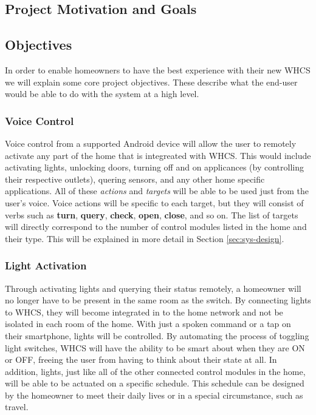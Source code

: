 
\subsection{Project Motivation and Goals}


\subsection{Objectives}
In order to enable homeowners to have the best experience with their new WHCS
we will explain some core project objectives. These describe what the end-user
would be able to do with the system at a high level.

\subsubsection{Voice Control}
Voice control
from a supported Android device will allow the user to remotely activate any
part of the home that is integreated with WHCS. This would include activating
lights, unlocking doors, turning off and on applicances (by controlling their
respective outlets), quering sensors, and any other home specific applications.
All of these \emph{actions} and \emph{targets} will be able to be used just
from the user's voice. Voice actions will be specific to each target, but they
will consist of verbs such as \textbf{turn}, \textbf{query}, \textbf{check},
\textbf{open}, \textbf{close}, and so on. The list of targets will directly
correspond to the number of control modules listed in the home and their type.
This will be explained in more detail in Section \ref{sec:sys-design}.

\subsubsection{Light Activation}
Through activating lights and querying their status remotely, a homeowner will
no longer have to be present in the same room as the switch.  By connecting
lights to WHCS, they will become integrated in to the home network and not be
isolated in each room of the home.  With just a spoken command or a tap on
their smartphone, lights will be controlled.  By automating the process of
toggling light switches, WHCS will have the ability to be smart about when they
are ON or OFF, freeing the user from having to think about their state at all.
In addition, lights, just like all of the other connected control modules in
the home, will be able to be actuated on a specific schedule. This schedule
 can be designed by the homeowner
to meet their daily lives or in a special circumstance, such as travel.

